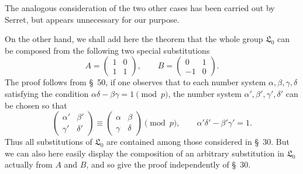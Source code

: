 \documentclass[11pt]{article}
\providecommand{\Lzero}{\mathfrak L_0}
\begin{document}
The analogous consideration of the two other cases has been carried out by Serret, but appears unnecessary for our purpose.

On the other hand, we shall add here the theorem that the whole group $\Lzero$ can be composed from the following two special substitutions
\begin{equation}
 A=\begin{pmatrix}1&0\\1&1\end{pmatrix},
 \qquad
 B=\begin{pmatrix}0&1\\-1&0\end{pmatrix}.
\tag{10}
\end{equation}
The proof follows from \S~50, if one observes that to each number system $\alpha,\beta,\gamma,\delta$ satisfying the condition $\alpha\delta-\beta\gamma=1\pmod p$, the number system $\alpha',\beta',\gamma',\delta'$ can be chosen so that
\[
 \begin{pmatrix}\alpha'&\beta'\\\gamma'&\delta'\end{pmatrix}
 \equiv
 \begin{pmatrix}\alpha&\beta\\\gamma&\delta\end{pmatrix}
 \pmod p,
 \qquad
 \alpha'\delta'-\beta'\gamma'=1.
\]
Thus all substitutions of $\Lzero$ are contained among those considered in \S~30. But we can also here easily display the composition of an arbitrary substitution in $\Lzero$ actually from $A$ and $B$, and so give the proof independently of \S~30.
\end{document}
